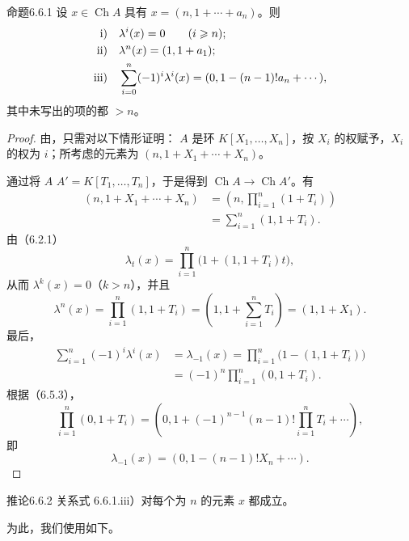 \begin{SGAresult}{命题}{6.6.1}
设 $x\in\operatorname{Ch}A$ 具有 $x=(n,1+\cdots+a_n)$。则
\[
\begin{aligned}
\textup{i)}\quad&\lambda^i(x)=0\qquad(i\geqslant n);\\
\textup{ii)}\quad&\lambda^n(x)=(1,1+a_1);\\
\textup{iii)}\quad&\sum_{i=0}^n(-1)^i\lambda^i(x)
 =(0,1-(n-1)!a_n+\cdots),
\end{aligned}
\]
其中未写出的项的都 $>n$。
\end{SGAresult}
\begin{proof}
由，只需对以下情形证明：
$A$ 是环 $K[X_1,\ldots,X_n]$，按 $X_i$ 的权赋予，$X_i$ 的权为 $i$；所考虑的元素为 $(n,1+X_1+\cdots+X_n)$。

通过将 $A$  $A'=K[T_1,\ldots,T_n]$，于是得到
$\operatorname{Ch}A\longrightarrow\operatorname{Ch}A'$。有
\[
\begin{aligned}
(n,1+X_1+\cdots+X_n)
 &=\left(n,\prod_{i=1}^n(1+T_i)\right)\\
 &=\sum_{i=1}^n(1,1+T_i).
\end{aligned}
\]
由（6.2.1）
\[
\lambda_t(x)=\prod_{i=1}^n\bigl(1+(1,1+T_i)t\bigr),
\]
从而 $\lambda^k(x)=0$（$k>n$），并且
\[
\lambda^n(x)=\prod_{i=1}^n(1,1+T_i)
 =\left(1,1+\sum_{i=1}^nT_i\right)=(1,1+X_1).
\]
最后，
\[
\begin{aligned}
\sum_{i=1}^n(-1)^i\lambda^i(x)
 &=\lambda_{-1}(x)
 =\prod_{i=1}^n\bigl(1-(1,1+T_i)\bigr)\\
 &=(-1)^n\prod_{i=1}^n(0,1+T_i).
\end{aligned}
\]
根据（6.5.3），
\[
\prod_{i=1}^n(0,1+T_i)
 =\left(0,1+(-1)^{n-1}(n-1)!\prod_{i=1}^nT_i+\cdots\right),
\]
即
\[
\lambda_{-1}(x)=(0,1-(n-1)!X_n+\cdots).
\]
\end{proof}

\begin{SGAresult}{推论}{6.6.2}
关系式 6.6.1.iii）对每个为 $n$ 的元素 $x$ 都成立。
\end{SGAresult}
为此，我们使用如下。

